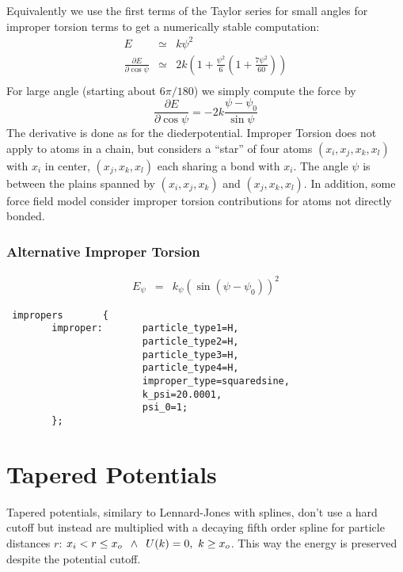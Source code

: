Equivalently we use the first terms of the Taylor series for small angles
for improper torsion terms to get a numerically stable computation:
\begin{eqnarray*}
E &\simeq& k \psi^2 \\
\frac{ \partial E}{\partial \cos\psi} &\simeq& 2 k
  \left( 1 + \frac{\psi^2}{6} \left(1 + \frac{7 \psi^2}{60} \right) \right) \\
\end{eqnarray*}
For large angle (starting about $6 \pi/180$) we simply compute the force by
\[ \frac{ \partial E}{\partial \cos\psi} =
    -2 k \frac{ \psi - \psi_0 }{ \sin\psi} \]
The derivative is done as for the diederpotential. Improper Torsion does not
apply to atoms in a chain, but considers a ``star'' of four atoms $(x_i, x_j,
x_k, x_l)$ with $x_i$ in center, $(x_j,x_k,x_l)$ each sharing a bond with $x_i$.
The angle $\psi$ is between the plains spanned by
$(x_i,x_j,x_k)$ and $(x_j,x_k,x_l)$.
In addition, some force field model consider improper torsion contributions for atoms not directly bonded.

\nocite{charmm83}
\nocite{charmm27b-online}

\subsubsection{Alternative Improper Torsion}
\begin{eqnarray*}
E_{\psi} &=& k_{\psi} \left(\sin( \psi - \psi_0)\right)^2
\end{eqnarray*}

\begin{lstlisting}
 impropers       {
        improper:       particle_type1=H,
                        particle_type2=H,
                        particle_type3=H,
                        particle_type4=H,
                        improper_type=squaredsine,
                        k_psi=20.0001,
                        psi_0=1;
        };
\end{lstlisting}




\section{Tapered Potentials}
\label{sec:Tapered}
Tapered potentials, similary to Lennard-Jones with splines, don't use a hard
cutoff but instead are multiplied with a decaying fifth order spline for
particle distances $r$: $x_i < r \leq x_o \enskip \wedge \enskip U(k) = 0,\  k \geq x_o$. This
way the energy is preserved despite the potential cutoff.

